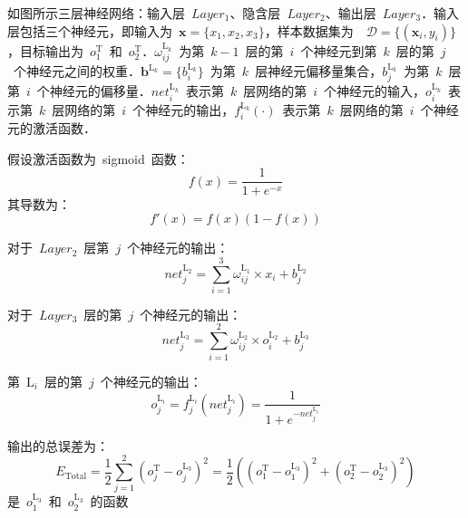 \documentclass[a4paper, UTF8, heading = true, scheme = chinese, linespread = 1.66, titlepage]{ctexart}
\begin{document}
如图所示三层神经网络：输入层~$Layer_1$、隐含层~$Layer_2$、输出层~$Layer_3$．输入层包括三个神经元，即输入为~$\bm{x}=\{x_1,x_2,x_3\}$，样本数据集为~~$\mathcal{D}=\{(\bm{x}_i,y_i)\}$，目标输出为~$o^{\text{T}}_1$~和~$o^{\text{T}}_2$．$\omega^{\text{L}_k}_{ij}$~为第~$k-1$~层的第~$i$~个神经元到第~$k$~层的第~$j$~个神经元之间的权重．$\bm{b}^{\text{L}_k}=\{b^{\text{L}_k}_{i}\}$~为第~$k$~层神经元偏移量集合，$b^{\text{L}_k}_{j}$~为第~$k$~层第~$i$~个神经元的偏移量．$net^{\text{L}_k}_{i}$~表示第~$k$~层网络的第~$i$~个神经元的输入，$o^{\text{L}_k}_{i}$~表示第~$k$~层网络的第~$i$~个神经元的输出，$f^{\text{L}_k}_{i}(\cdot)$~表示第~$k$~层网络的第~$i$~个神经元的激活函数．



假设激活函数为~sigmoid~函数：
\begin{equation}
f(x) = \frac{1}{1+e^{-x}}
\end{equation}
其导数为：
\begin{equation}
f'(x) = f(x)(1-f(x))
\end{equation}


对于~$Layer_2$~层第~$j$~个神经元的输出：
\begin{equation}
net^{\text{L}_2}_{j} = \sum_{i=1}^{3}{\omega^{\text{L}_1}_{ij} \times x_i} + b^{\text{L}_2}_{j}
\end{equation}

对于~$Layer_3$~层的第~$j$~个神经元的输出：
\begin{equation}
net^{\text{L}_3}_{j} = \sum_{i=1}^{2}{\omega^{\text{L}_2}_{ij} \times o^{\text{L}_2}_i} + b^{\text{L}_3}_{j}
\end{equation}


第~$\text{L}_i$~层的第~$j$~个神经元的输出：
\begin{equation}
o^{\text{L}_i}_{j} = f^{\text{L}_i}_{j}{(net^{\text{L}_i}_j)} = \frac{1}{1+e^{-net^{\text{L}_i}_j}}
\end{equation}

输出的总误差为：
\begin{equation}
E_{\text{Total}} = \frac{1}{2}\sum_{j=1}^{2}{(o^{\text{T}}_j - o^{\text{L}_3}_{j})^2} = \frac{1}{2}((o^{\text{T}}_1 - o^{\text{L}_3}_{1})^2 + (o^{\text{T}}_2 - o^{\text{L}_3}_{2})^2)
\end{equation}
是~$o^{\text{L}_3}_{1}$~和~$o^{\text{L}_3}_{2}$~的函数
\end{document}
